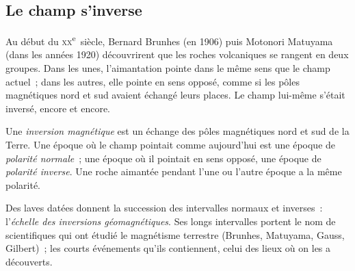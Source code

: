 \subsection{Le champ s'inverse}

Au début du \textsc{xx}\textsuperscript{e}~siècle, Bernard Brunhes (en 1906)
puis Motonori Matuyama (dans les années 1920) découvrirent que les roches
volcaniques se rangent en deux groupes. Dans les unes, l'aimantation pointe
dans le même sens que le champ actuel~; dans les autres, elle pointe en sens
opposé, comme si les pôles magnétiques nord et sud avaient échangé leurs
places. Le champ lui-même s'était inversé, encore et encore.

\begin{definition}\label{def:g11:drift-to-spreading:reversal}
Une \emph{inversion magnétique}
est un échange des pôles magnétiques nord et sud de la Terre.
Une époque où le champ pointait comme aujourd'hui est une époque de
\emph{polarité normale}~; une
époque où il pointait en sens opposé, une époque de \emph{polarité
inverse}. Une roche aimantée
pendant l'une ou l'autre époque a la même polarité.
\end{definition}

Des laves datées donnent la succession des intervalles normaux et
inverses~: l'\emph{échelle des inversions géomagnétiques}. Ses longs
intervalles portent le nom de scientifiques qui ont étudié le magnétisme
terrestre (Brunhes, Matuyama, Gauss, Gilbert)~; les courts événements qu'ils
contiennent, celui des lieux où on les a découverts.

